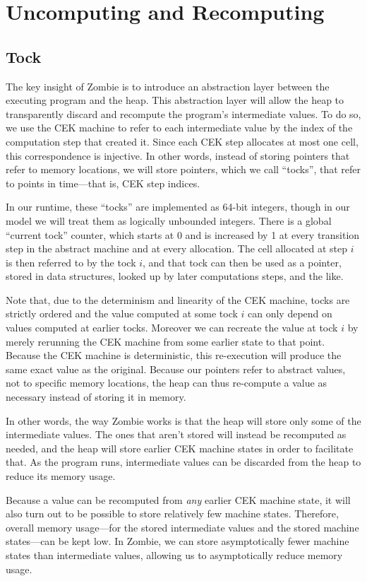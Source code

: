 \section{Uncomputing and Recomputing}
\subsection{Tock}
The key insight of Zombie is to introduce an abstraction layer between the executing program and the heap. This abstraction layer will allow the heap to transparently discard and recompute the program's intermediate values. To do so, we use the CEK machine to refer to each intermediate value by the index of the computation step that created it. Since each CEK step allocates at most one cell, this correspondence is injective. In other words, instead of storing pointers that refer to memory locations, we will store pointers, which we call ``tocks'', that refer to points in time---that is, CEK step indices.

In our runtime, these ``tocks'' are implemented as 64-bit integers, though in our model we will treat them as logically unbounded integers. There is a global ``current tock'' counter, which starts at 0 and is increased by 1 at every transition step in the abstract machine and at every allocation. The cell allocated at step $i$ is then referred to by the tock $i$, and that tock can then be used as a pointer, stored in data structures, looked up by later computations steps, and the like.

Note that, due to the determinism and linearity of the CEK machine, tocks are strictly ordered and the value computed at some tock $i$ can only depend on values computed at earlier tocks. Moreover we can recreate the value at tock $i$ by merely rerunning the CEK machine from some earlier state to that point. Because the CEK machine is deterministic, this re-execution will produce the same exact value as the original. Because our pointers refer to abstract values, not to specific memory locations, the heap can thus re-compute a value as necessary instead of storing it in memory.

In other words, the way Zombie works is that the heap will store only some of the intermediate values. The ones that aren't stored will instead be recomputed as needed, and the heap will store earlier CEK machine states in order to facilitate that. As the program runs, intermediate values can be discarded from the heap to reduce its memory usage.

Because a value can be recomputed from \emph{any} earlier CEK machine state, it will also turn out to be possible to store relatively few machine states. Therefore, overall memory usage---for the stored intermediate values and the stored machine states---can be kept low. In Zombie, we can store asymptotically fewer machine states than intermediate values, allowing us to asymptotically reduce memory usage.

